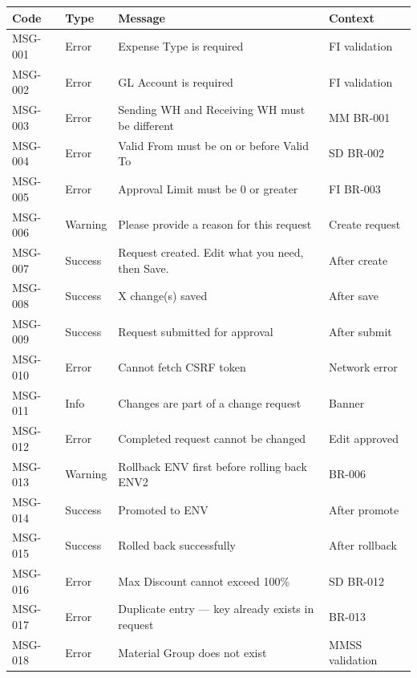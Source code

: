 \documentclass[12pt,a4paper]{report}
\begin{document}
\begin{longtable}{|l|l|p{7cm}|l|}
  \hline
  \rowcolor{tableheadpeach}
  \textbf{Code} & \textbf{Type} & \textbf{Message} & \textbf{Context} \\ \hline
  \endhead \hline \endfoot
  MSG-001 & Error   & Expense Type is required                           & FI validation \\ \hline
  MSG-002 & Error   & GL Account is required                             & FI validation \\ \hline
  MSG-003 & Error   & Sending WH and Receiving WH must be different      & MM BR-001 \\ \hline
  MSG-004 & Error   & Valid From must be on or before Valid To            & SD BR-002 \\ \hline
  MSG-005 & Error   & Approval Limit must be 0 or greater                & FI BR-003 \\ \hline
  MSG-006 & Warning & Please provide a reason for this request            & Create request \\ \hline
  MSG-007 & Success & Request created. Edit what you need, then Save.     & After create \\ \hline
  MSG-008 & Success & X change(s) saved                                  & After save \\ \hline
  MSG-009 & Success & Request submitted for approval                      & After submit \\ \hline
  MSG-010 & Error   & Cannot fetch CSRF token                            & Network error \\ \hline
  MSG-011 & Info    & Changes are part of a change request                & Banner \\ \hline
  MSG-012 & Error   & Completed request cannot be changed                 & Edit approved \\ \hline
  MSG-013 & Warning & Rollback ENV first before rolling back ENV2         & BR-006 \\ \hline
  MSG-014 & Success & Promoted to ENV                                     & After promote \\ \hline
  MSG-015 & Success & Rolled back successfully                            & After rollback \\ \hline
  MSG-016 & Error   & Max Discount cannot exceed 100\%                    & SD BR-012 \\ \hline
  MSG-017 & Error   & Duplicate entry --- key already exists in request   & BR-013 \\ \hline
  MSG-018 & Error   & Material Group does not exist                       & MMSS validation \\ \hline
\end{longtable}
\end{document}
